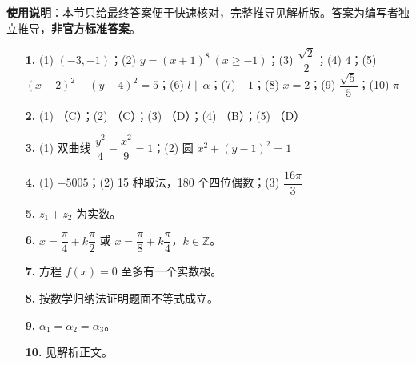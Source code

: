
\begin{gknotice}
\textbf{使用说明}：本节只给最终答案便于快速核对，完整推导见解析版。答案为编写者独立推导，\textbf{非官方标准答案}。
\end{gknotice}

\begin{itemize}[leftmargin=2.6em]
  \item[\textbf{1.}] (1) $(-3,-1)$；(2) $y=(x+1)^8\ (x\ge-1)$；(3) $\dfrac{\sqrt2}{2}$；(4) $4$；(5) $(x-2)^2+(y-4)^2=5$；(6) $l\parallel\alpha$；(7) $-1$；(8) $x=2$；(9) $\dfrac{\sqrt5}{5}$；(10) $\pi$
  \item[\textbf{2.}] (1) （C）；(2) （C）；(3) （D）；(4) （B）；(5) （D）
  \item[\textbf{3.}] (1) 双曲线 $\dfrac{y^2}{4}-\dfrac{x^2}{9}=1$；(2) 圆 $x^2+(y-1)^2=1$
  \item[\textbf{4.}] (1) $-5005$；(2) 15 种取法，180 个四位偶数；(3) $\dfrac{16\pi}{3}$
  \item[\textbf{5.}] $z_1+z_2$ 为实数。
  \item[\textbf{6.}] $x=\dfrac\pi4+k\dfrac\pi2$ 或 $x=\dfrac\pi8+k\dfrac\pi4$，$k\in\mathbb Z$。
  \item[\textbf{7.}] 方程 $f(x)=0$ 至多有一个实数根。
  \item[\textbf{8.}] 按数学归纳法证明题面不等式成立。
  \item[\textbf{9.}] $\alpha_1=\alpha_2=\alpha_3$。
  \item[\textbf{10.}] 见解析正文。
\end{itemize}
